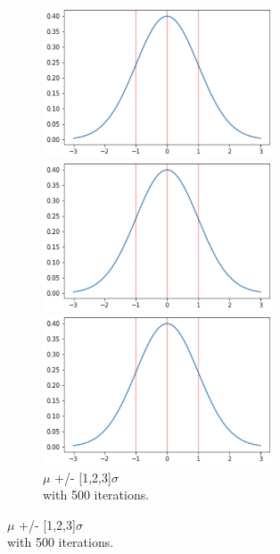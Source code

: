 \documentclass[12pt]{article}
\begin{document}
\newpage

\noindent
\begin{figure}[b]
\centering
\begin{subfigure}{.32\textwidth}
    \centering
    \includegraphics[width=0.75\textwidth]{sd_3.png}
    \caption[short]{$\mu$ +/- [1]$\sigma$ \\with 500 iterations.}
    \includegraphics[width=0.75\textwidth]{sd_3.png}
    \caption[short]{$\mu$ +/- [1,2]$\sigma$ \\with 500 iterations.}
    \includegraphics[width=0.75\textwidth]{sd_3.png}
    \caption[short]{$\mu$ +/- [1,2,3]$\sigma$ \\with 500 iterations.}
\end{subfigure}

\end{figure}
\end{document}
